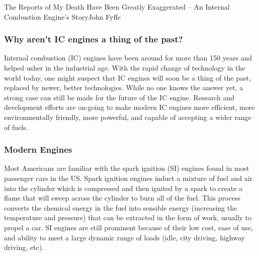 \documentclass[10pt]{papertex}
\begin{document}
\makeatletter
\renewcommand{\papertex@headDateTime}{
    \raisebox{-5pt}
    {\fontsize{5mm}{6mm}\usefont{T1}{bch}{b}{n}{April 2014}}
    }
\makeatother


\begin{news}{2}{The Reports of My Death Have Been Greatly Exaggerated -- An Internal Combustion Engine’s Story}{John Fyffe}{}{}

\subsubsection*{Why aren’t IC engines a thing of the past?}

Internal combustion (IC) engines have been around for more than 150 years and 
helped usher in the industrial age.  With the rapid change of technology in 
the world today, one might suspect that IC engines will soon be a thing of 
the past, replaced by newer, better technologies.  While no one knows the 
answer yet, a strong case can still be made for the future of the IC engine.  
Research and development efforts are on-going to make modern IC engines more 
efficient, more environmentally friendly, more powerful, and capable of 
accepting a wider range of fuels.


\subsubsection*{Modern Engines}

Most Americans are familiar with the spark ignition (SI) engines found in most 
passenger cars in the US.  Spark ignition engines induct a mixture of fuel and 
air into the cylinder which is compressed and then ignited by a spark to create 
a flame that will sweep across the cylinder to burn all of the fuel.  This 
process converts the chemical energy in the fuel into sensible energy 
(increasing the temperature and pressure) that can be extracted in the form 
of work, usually to propel a car.  SI engines are still prominent because of 
their low cost, ease of use, and ability to meet a large dynamic range of 
loads (idle, city driving, highway driving, etc).


\end{news}
\end{document}
